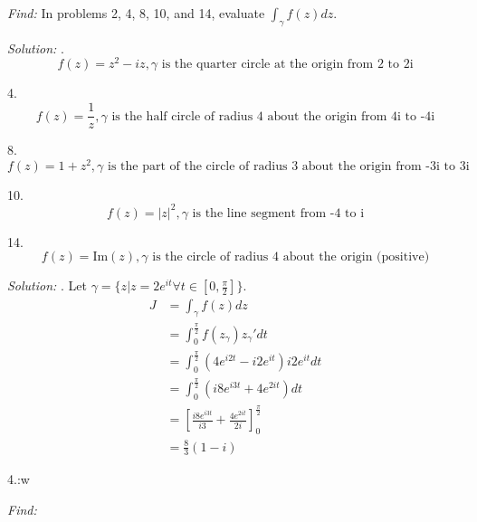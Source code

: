 \documentclass[11pt]{homework}
\begin{document}
\maketitle

\emph{Find:}
\newline
In problems 2, 4, 8, 10, and 14,
evaluate $\int_{\gamma} f(z) dz$.

\emph{Solution:}
.
\begin{equation*}
  f(z) = z^2 - iz, \gamma \text{ is the quarter circle at the origin from 2 to 2i}
\end{equation*}

4.
\begin{equation*}
  f(z) = \frac{1}{z}, \gamma \text{ is the half circle of radius 4 about the origin from 4i to -4i}
\end{equation*}

8.
\begin{equation*}
  f(z) = 1 + z^2, \gamma \text{ is the part of the circle of radius 3 about the origin from -3i to 3i}
\end{equation*}

10. %
\begin{equation*}
  f(z) = |z|^2, \gamma \text{ is the line segment from -4 to i}
\end{equation*}

14.
\begin{equation*}
  f(z) = \text{Im}(z), \gamma \text{ is the circle of radius 4 about the origin (positive)}
\end{equation*}

\emph{Solution:}
. Let $\gamma = \{z | z = 2 e^{it} \forall t\in[0,\frac{\pi}{2}]\}$.
\begin{align*}
  J &= \int_\gamma f(z) dz \\
    &= \int_0^{\frac{\pi}{2}} f(z_\gamma) z_\gamma' dt \\
    &= \int_0^{\frac{\pi}{2}} (4e^{i2t} - i2e^{it}) i2e^{it} dt \\
    &= \int_0^{\frac{\pi}{2}} (i8e^{i3t} + 4e^{2it}) dt\\
    &= \left[ \frac{i8e^{i3t}}{i3} + \frac{4e^{2it}}{2i} \right]_0^\frac{\pi}{2} \\
    &= \frac{8}{3} (1-i)
\end{align*}

4.:w

\emph{Find:}
\end{document}
